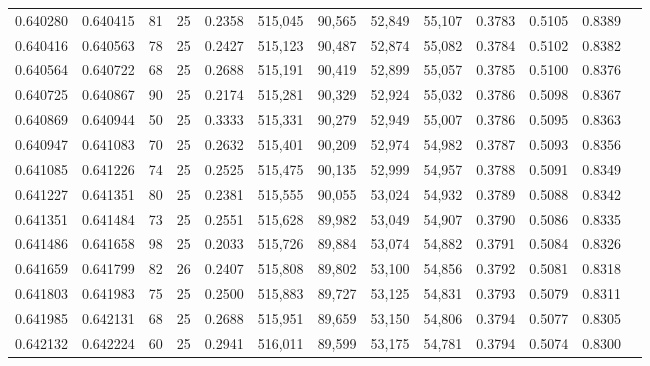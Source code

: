 \begin{tabular}{rrrrrrrrrrrrr}
0.640280 & 0.640415 &    81 &  25 &                                     0.2358 & 515,045 &  90,565 &  52,849 &  55,107 & 0.3783 & 0.5105 & 0.8389 \\
0.640416 & 0.640563 &    78 &  25 &                                     0.2427 & 515,123 &  90,487 &  52,874 &  55,082 & 0.3784 & 0.5102 & 0.8382 \\
0.640564 & 0.640722 &    68 &  25 &                                     0.2688 & 515,191 &  90,419 &  52,899 &  55,057 & 0.3785 & 0.5100 & 0.8376 \\
0.640725 & 0.640867 &    90 &  25 &                                     0.2174 & 515,281 &  90,329 &  52,924 &  55,032 & 0.3786 & 0.5098 & 0.8367 \\
0.640869 & 0.640944 &    50 &  25 &                                     0.3333 & 515,331 &  90,279 &  52,949 &  55,007 & 0.3786 & 0.5095 & 0.8363 \\
0.640947 & 0.641083 &    70 &  25 &                                     0.2632 & 515,401 &  90,209 &  52,974 &  54,982 & 0.3787 & 0.5093 & 0.8356 \\
0.641085 & 0.641226 &    74 &  25 &                                     0.2525 & 515,475 &  90,135 &  52,999 &  54,957 & 0.3788 & 0.5091 & 0.8349 \\
0.641227 & 0.641351 &    80 &  25 &                                     0.2381 & 515,555 &  90,055 &  53,024 &  54,932 & 0.3789 & 0.5088 & 0.8342 \\
0.641351 & 0.641484 &    73 &  25 &                                     0.2551 & 515,628 &  89,982 &  53,049 &  54,907 & 0.3790 & 0.5086 & 0.8335 \\
0.641486 & 0.641658 &    98 &  25 &                                     0.2033 & 515,726 &  89,884 &  53,074 &  54,882 & 0.3791 & 0.5084 & 0.8326 \\
0.641659 & 0.641799 &    82 &  26 &                                     0.2407 & 515,808 &  89,802 &  53,100 &  54,856 & 0.3792 & 0.5081 & 0.8318 \\
0.641803 & 0.641983 &    75 &  25 &                                     0.2500 & 515,883 &  89,727 &  53,125 &  54,831 & 0.3793 & 0.5079 & 0.8311 \\
0.641985 & 0.642131 &    68 &  25 &                                     0.2688 & 515,951 &  89,659 &  53,150 &  54,806 & 0.3794 & 0.5077 & 0.8305 \\
0.642132 & 0.642224 &    60 &  25 &                                     0.2941 & 516,011 &  89,599 &  53,175 &  54,781 & 0.3794 & 0.5074 & 0.8300 \\

\end{tabular}
